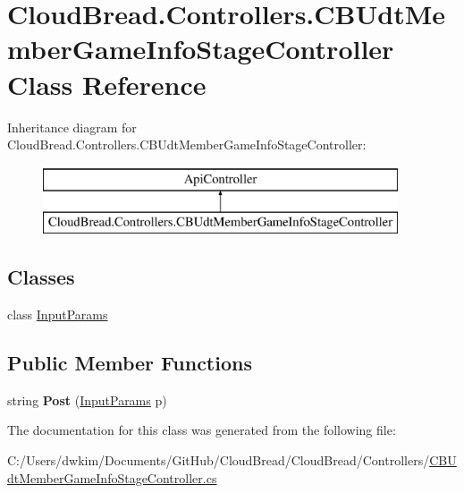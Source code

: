 \hypertarget{a00059}{}\section{Cloud\+Bread.\+Controllers.\+C\+B\+Udt\+Member\+Game\+Info\+Stage\+Controller Class Reference}
\label{a00059}
Inheritance diagram for Cloud\+Bread.\+Controllers.\+C\+B\+Udt\+Member\+Game\+Info\+Stage\+Controller\+:\begin{figure}[H]
\begin{center}
\leavevmode
\includegraphics[height=2.000000cm]{a00059}
\end{center}
\end{figure}
\subsection*{Classes}
\begin{DoxyCompactItemize}
\item 
class \hyperlink{a00111}{Input\+Params}
\end{DoxyCompactItemize}
\subsection*{Public Member Functions}
\begin{DoxyCompactItemize}
\item 
string {\bfseries Post} (\hyperlink{a00111}{Input\+Params} p)\hypertarget{a00059_a5592ec08155ea3fb8a2484b2f430f5e4}{}\label{a00059_a5592ec08155ea3fb8a2484b2f430f5e4}

\end{DoxyCompactItemize}


The documentation for this class was generated from the following file\+:\begin{DoxyCompactItemize}
\item 
C\+:/\+Users/dwkim/\+Documents/\+Git\+Hub/\+Cloud\+Bread/\+Cloud\+Bread/\+Controllers/\hyperlink{a00230}{C\+B\+Udt\+Member\+Game\+Info\+Stage\+Controller.\+cs}\end{DoxyCompactItemize}
